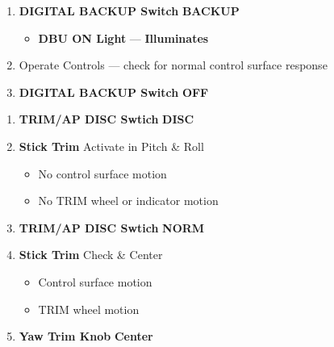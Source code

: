\begin{checklistenumerate}[resume]
{    }
    \begin{enumerate}
        \item \textbf{DIGITAL BACKUP Switch} \dotfill \textbf{BACKUP}
        \begin{itemize}
            \item \textbf{DBU ON Light} --- \textbf{Illuminates}
        \end{itemize}
        \item Operate Controls --- check for normal control surface response
        \item \textbf{DIGITAL BACKUP Switch} \dotfill \textbf{OFF}
    \end{enumerate}
    \begin{enumerate}
        \item \textbf{TRIM/AP DISC Swtich} \dotfill \textbf{DISC}
        \item \textbf{Stick Trim} \dotfill Activate in Pitch \& Roll
        \begin{itemize}
            \item No control surface motion 
            \item No TRIM wheel or indicator motion
        \end{itemize} 
        \item \textbf{TRIM/AP DISC Swtich} \dotfill \textbf{NORM}
        \item \textbf{Stick Trim} \dotfill Check \& Center
        \begin{itemize}
            \item Control surface motion 
            \item TRIM wheel motion
        \end{itemize} 
        \item \textbf{Yaw Trim Knob} \dotfill \textbf{Center}
    \end{enumerate}
\end{checklistenumerate}

\clearpage

